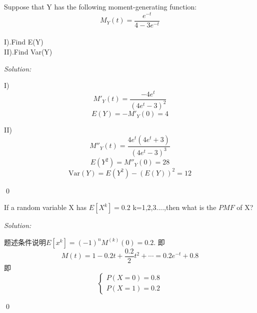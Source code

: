 \documentclass[12pt]{article}
\newenvironment{problem}[2][Problem]{\begin{trivlist}
\item[\hskip \labelsep {\bfseries #1}\hskip \labelsep {\bfseries #2.}]}{\end{trivlist}}
\newenvironment{sol}
    {\emph{Solution:}
    }
    {
    \qed
    }
\newcommand{\f}[2]{\frac{#1}{#2}}                                      %
\newcommand{\hua}[2][rl]{\left\{\begin{array}{#1}                              %
        #2
    \end{array}\right.}
\begin{document}
\begin{problem}{7}
 Suppose that Y has the following moment-generating function:
 $$ M_{Y}(t) = \frac{e^{-t}}{4-3e^{-t}}$$
 \\
 I).Find E(Y)\\
 II).Find Var(Y)
\end{problem}
\begin{sol}
I) $$M'_Y(t) = \f{-4e^t}{(4e^t-3)^2}$$
$$E(Y) = -M'_Y(0) = 4$$ 

II) $$M''_Y(t) = \frac{4 e^t \left(4 e^t+3\right)}{\left(4 e^t-3\right)^3}$$
$$E(Y^2) = M''_Y(0) = 28$$
$$\text{Var}(Y) = E(Y^2)-(E(Y))^2 = 12$$
\end{sol}



\begin{problem}{8}If a random variable X has  $E[X^k] = 0.2$ k=1,2,3....,then what is the $ PMF$ of X?
\end{problem}
\begin{sol}
题述条件说明$E[x^k] = (-1)^nM^{(k)}(0) = 0.2$.
即$$M(t)=1-0.2t+\f{0.2}{2}t^2+\cdots = 0.2e^{-t}+0.8$$
即$$\hua{P(X=0)=0.8\\P(X=1)=0.2}$$
\end{sol}

\end{document}
